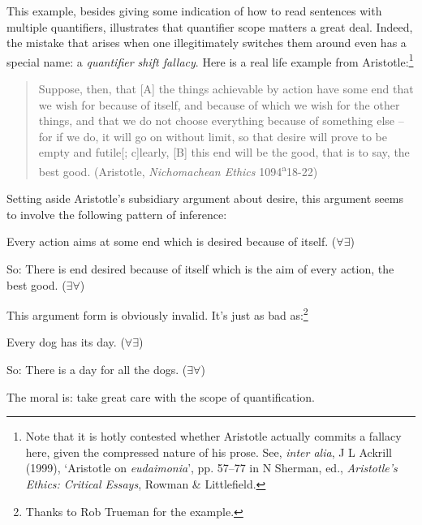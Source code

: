 This example, besides giving some indication of how to read sentences with multiple quantifiers, illustrates that quantifier scope matters a great deal. Indeed, the mistake that arises when one illegitimately switches them around even has a special name: a \emph{quantifier shift fallacy}. Here is a real life example from Aristotle:\footnote{Note that it is hotly contested whether Aristotle actually commits a fallacy here, given the compressed nature of his prose. See, \emph{inter alia}, J L Ackrill (1999), `Aristotle on \emph{eudaimonia}', pp. 57–77 in N Sherman, ed., \emph{Aristotle’s Ethics: Critical Essays}, Rowman \& Littlefield.} \begin{quote}
	Suppose, then, that [A] the things achievable by action have some end that we wish for because of itself, and because of which we wish for the other things, and that we do not choose everything because of something else – for if we do, it will go on without limit, so that desire will prove to be empty and futile[; c]learly, [B] this end will be the good, that is to say, the best good. (Aristotle,  \emph{Nichomachean Ethics} 1094\textsuperscript{a}18-22)
\end{quote} Setting aside Aristotle's subsidiary argument about desire, this argument seems to involve the following pattern of inference: \begin{earg}
		\item[] Every action aims at some end which is desired because of itself. \hfill ($\forall \exists$)
		\item[So:] There is end desired because of itself which is the aim of every action, the best good. \hfill ($\exists \forall$)
	\end{earg}
This argument form is obviously invalid. It's just as bad as:\footnote{Thanks to Rob Trueman for the example.}
	\begin{earg}
		\item[] Every dog has its day. \hfill ($\forall \exists$)
		\item[So:] There is a day for all the dogs. \hfill ($\exists \forall$)
	\end{earg}
The moral is: take great care with the scope of quantification. 




